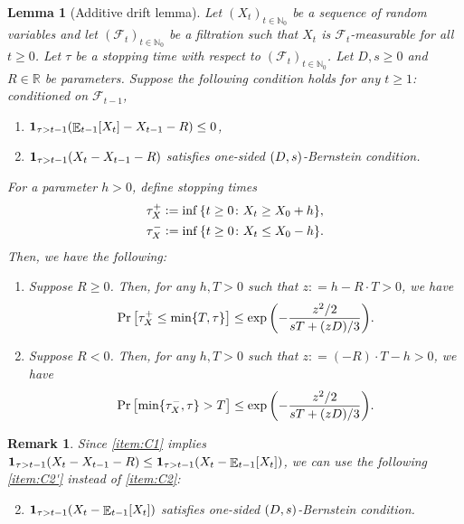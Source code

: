 \documentclass[letterpaper,11pt]{article}
\newtheorem{lemma}[theorem]{Lemma}
\newtheorem{remark}[theorem]{Remark}
\def\defeq{\mathrel{\mathop:}=}
\DeclarePairedDelimiter{\rbra}{\lparen}{\rparen} %
\DeclarePairedDelimiter{\cbra}{\lbrace}{\rbrace} %
\newcommand{\indicator}{\mathbf{1}}
\DeclareMathOperator*{\E}{\mathbb{E}}
\newcommand{\Nat}{\mathbb{N}}
\newcommand{\Real}{\mathbb{R}}
\newcommand{\calF}{\mathcal{F}}
\newcommand{\bounded}{D}
\newcommand{\variance}{s}
\newcommand{\drift}{R}
\newcommand{\tauxplus}{\tau_X^+}
\newcommand{\tauxminus}{\tau_X^-}
\begin{document}
\begin{lemma}[Additive drift lemma] \label{lem:Freedman stopping time additive}
 Let $(X_t)_{t\in \Nat_0}$ be a sequence of random variables and
 let $(\calF_t)_{t\in\Nat_0}$ be a filtration such that $ X_t $ is $ \calF_t $-measurable for all $t\ge 0$.
 Let $\tau$ be a stopping time with respect to $(\calF_t)_{t\in \Nat_0}$.
 Let $\bounded,\variance \ge 0$ and $\drift\in\Real$ be parameters.
 Suppose the following condition holds for any $t\geq 1$: conditioned on $\mathcal{F}_{t-1}$, 
      \begin{enumerate}[label=$(C\arabic*)$]
        \item $\indicator_{\tau>t-1}\rbra*{\E_{t-1}[X_t]-X_{t-1}-\drift}\leq 0$, \label{item:C1}
        \item $\indicator_{\tau>t-1}\rbra*{X_t-X_{t-1}-\drift}$ satisfies one-sided $\qty(\bounded,\variance)$-Bernstein condition. \label{item:C2}
      \end{enumerate}
    For a parameter $h>0$, define stopping times
    \begin{align*} 
      &\tauxplus\defeq \inf\qty{t\geq 0\colon X_t\geq X_0+h}, \\
      &\tauxminus \defeq \inf\qty{t\geq 0\colon X_t\leq X_0-h}.
    \end{align*}
    Then, we have the following:
      \begin{enumerate}
        \renewcommand{\labelenumi}{(\roman{enumi})}
        \item \label{item:positive drift} Suppose $\drift\geq 0$. Then, for any $h,T>0$ such that $z \defeq h-\drift\cdot T > 0$, we have
        \[
        \Pr\qty[\tauxplus \le \min\{T,\tau\}] 
         \le \exp\qty(- \frac{z^2/2}{\variance T + (z \bounded)/3}).
        \]
        \item \label{item:negative drift} Suppose $\drift< 0$. Then, for any $h,T>0$ such that $ z \defeq (-\drift)\cdot T - h > 0$, we have
        \[
        \Pr\qty[\min\cbra{\tauxminus,\tau} >T] 
         \le \exp\qty(- \frac{z^2/2}{\variance T + (z \bounded)/3}).
        \]
      \end{enumerate}
  \end{lemma}
    \begin{remark}
      Since \cref{item:C1} implies $\indicator_{\tau>t-1}\rbra*{X_t-X_{t-1}-R}\leq \indicator_{\tau>t-1}\rbra*{X_t-\E_{t-1}[X_t]}$, we can use the following \cref{item:C2'} instead of \cref{item:C2}:
      \begin{enumerate}[label=$(C\arabic*')$]
        \setcounter{enumi}{1}
        \item $\indicator_{\tau>t-1}\rbra*{X_t-\E_{t-1}[X_t]}$ satisfies one-sided $\qty(\bounded,\variance)$-Bernstein condition. \label{item:C2'}
      \end{enumerate}
    \end{remark}
\end{document}
